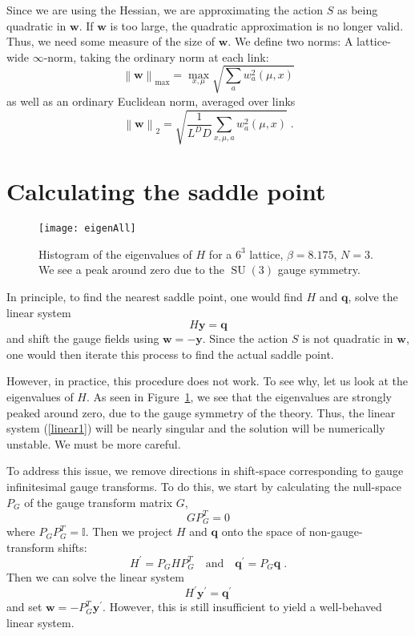 \documentclass[preprint,aps,prd]{revtex4-2}
\newcommand{\be}{\begin{equation}}
\newcommand{\eq}{\end{equation}}
\DeclareMathOperator{\SU}{SU}
\begin{document}
Since we are using the Hessian, we are approximating
the action $S$ as being quadratic in $\mathbf{w}$.  If $\mathbf{w}$
is too large, the quadratic approximation is no longer valid.
Thus, we need some measure of the size of $\mathbf{w}$.
We define two norms:
A lattice-wide $\infty$-norm, taking the ordinary norm at each link:
\be
\left\lVert \mathbf{w}\right\rVert_{\mathrm{max}} =
     \max_{x,\mu} \sqrt{\sum_a w_a^2(\mu, x)}
\eq
as well as an ordinary Euclidean norm, averaged over links
\be
\left\lVert \mathbf{w}\right\rVert_2 =
     \sqrt{\frac{1}{L^D D} \sum_{x, \mu, a} w_a^2(\mu, x)}
        \; .
\eq



\section{Calculating the saddle point}
\label{saddle}

\begin{figure}
\texttt{[image: eigenAll]}
\caption{Histogram of the eigenvalues of $H$ for a $6^3$ lattice,
  $\beta = 8.175$, $N=3$.  We see a peak around zero due to the
  $\SU(3)$ gauge symmetry.
  \label{eigenAll}}
\end{figure}

In principle, to find the nearest saddle point, one would
find $H$ and $\mathbf{q}$, solve the linear system
\be
    H \mathbf{y} = \mathbf{q} \label{linear1}
\eq
and shift the gauge fields using $\mathbf{w} = -\mathbf{y}$.
Since the action $S$ is not quadratic in $\mathbf{w}$, one
would then iterate this process to find the actual saddle point.

However, in practice, this procedure does not work.  To see why, let us
look at the eigenvalues of $H$.  As seen in Figure~\ref{eigenAll},
we see that the eigenvalues are strongly peaked around zero,
due to the gauge symmetry of the theory.  Thus, the linear
system (\ref{linear1}) will be nearly singular and
the solution will be numerically unstable.  We must be more careful.

To address this issue, we remove directions in shift-space corresponding
to gauge infinitesimal gauge transforms.  To do this, we start
by calculating the null-space $P_G$ of the gauge transform matrix $G$,
\be
G P_G^T = 0
\eq
where $P_G P_G^T = \mathbb{I}$.  Then we project $H$ and $\mathbf{q}$ onto
the space of non-gauge-transform shifts:
\be
         H^\prime = P_G H P_G^T \quad \mbox{and} \quad
         \mathbf{q}^\prime = P_G \mathbf{q} \; .
\eq
Then we can solve the linear system
\be
   H^\prime \mathbf{y}^\prime = \mathbf{q}^\prime \label{linear2}
\eq
and set $\mathbf{w} = - P_G^T \mathbf{y}^\prime$.  However, this is
still insufficient to yield a well-behaved linear system.
\end{document}
